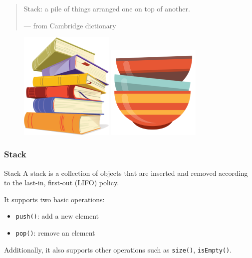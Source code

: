 \documentclass[aspectratio=169, 14pt]{beamer}
\begin{document}
\begin{frame}
    \begin{quote}
        Stack: a pile of things arranged one on top of another.
        \begin{flushright}
            --- from Cambridge dictionary
        \end{flushright}
    \end{quote}
    \pause
    \begin{figure}
        \includegraphics[width=0.4\textwidth, height=0.4\paperheight]{week3/book}
        \hfill
        \includegraphics[width=0.4\textwidth, height=0.4\paperheight]{week3/tray}
    \end{figure}
    \pause
\end{frame}

\begin{frame}
    \frametitle{Stack}
\begin{exampleblock}{Stack}
    A stack is a collection of objects that are inserted and removed according to the \alert{last-in, first-out (LIFO)} policy. 
\end{exampleblock}
It supports two basic operations:
\begin{itemize}
    \item \texttt{push()}: add a new element
    \item \texttt{pop()}: remove an element
\end{itemize}
Additionally, it also supports other operations such as \texttt{size()}, \texttt{isEmpty()}.
\end{frame}
\end{document}
